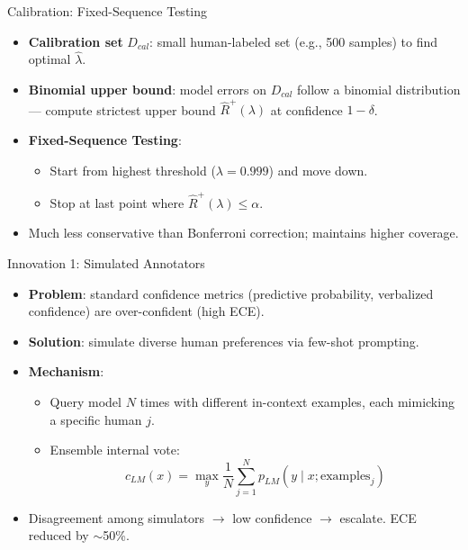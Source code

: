\documentclass[10pt]{beamer}
\begin{document}
\begin{frame}{Calibration: Fixed-Sequence Testing}
  \begin{itemize}
    \item \textbf{Calibration set} $D_{cal}$: small human-labeled set (e.g., 500 samples) to find optimal $\hat{\lambda}$.
    \item \textbf{Binomial upper bound}: model errors on $D_{cal}$ follow a binomial distribution --- compute strictest upper bound $\hat{R}^+(\lambda)$ at confidence $1-\delta$.
    \item \textbf{Fixed-Sequence Testing}:
      \begin{itemize}
        \item Start from highest threshold ($\lambda = 0.999$) and move down.
        \item Stop at last point where $\hat{R}^+(\lambda) \le \alpha$.
      \end{itemize}
    \item Much less conservative than Bonferroni correction; maintains higher coverage.
  \end{itemize}
\end{frame}

\begin{frame}{Innovation 1: Simulated Annotators}
  \begin{itemize}
    \item \textbf{Problem}: standard confidence metrics (predictive probability, verbalized confidence) are over-confident (high ECE).
    \item \textbf{Solution}: simulate diverse human preferences via few-shot prompting.
    \item \textbf{Mechanism}:
      \begin{itemize}
        \item Query model $N$ times with different in-context examples, each mimicking a specific human $j$.
        \item Ensemble internal vote:
        \[
        c_{LM}(x) = \max_y \frac{1}{N} \sum_{j=1}^{N} p_{LM}(y \mid x; \text{examples}_j)
        \]
      \end{itemize}
    \item Disagreement among simulators $\rightarrow$ low confidence $\rightarrow$ escalate. ECE reduced by $\sim$50\%.
  \end{itemize}
\end{frame}
\end{document}
